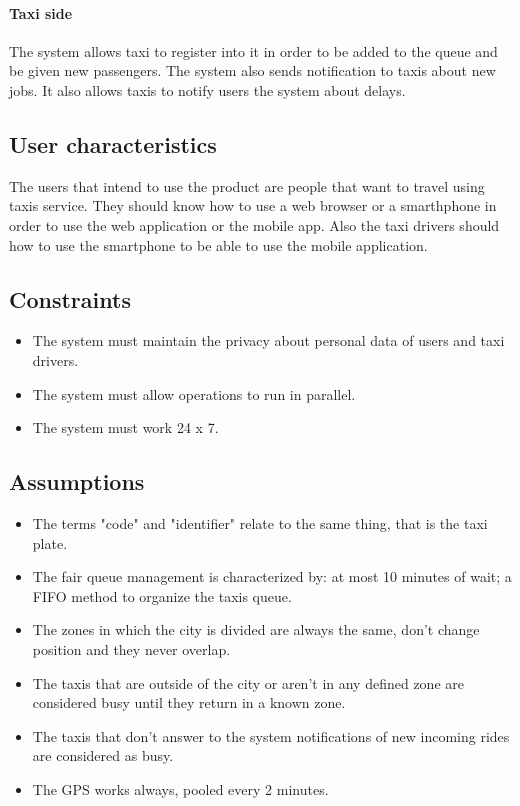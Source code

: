 		\paragraph{Taxi side}The system allows taxi to register into it in order to be added to the queue and be given new passengers. The system also sends notification to taxis about new jobs. It also allows taxis to notify users the system about delays.
	\subsection{User characteristics}
    The users that intend to use the product are people that want to travel using taxis service. They should know how to use a web browser or a smarthphone in order to use the web application or the mobile app. 
    Also the taxi drivers should how to use the smartphone to be able to use the mobile application.
	\subsection{Constraints}
	    \begin{itemize}
	    \item The system must maintain the privacy about personal data of users and taxi drivers.
	    \item The system must allow operations to run in parallel.
	    \item The system must work 24 x 7.
	    \end{itemize}
	\subsection{Assumptions}
	    \begin{itemize}
	    \item The terms "code" and "identifier" relate to the same thing, that is the taxi plate.
	    \item The fair queue management is characterized by: at most 10 minutes of wait; a FIFO method to organize the taxis queue.
	    \item The zones in which the city is divided are always the same, don't change position and they never overlap.
	    \item The taxis that are outside of the city or aren't in any defined zone are considered busy until they return in a known zone.
	    \item The taxis that don't answer to the system notifications of new incoming rides are considered as busy.
	    \item The GPS works always, pooled every 2 minutes.
	    \end{itemize}